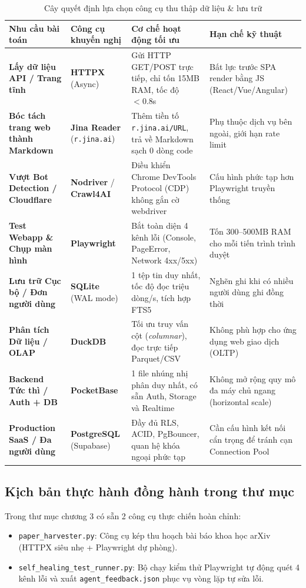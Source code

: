 \documentclass[a4paper,11pt]{article}
\begin{document}
\begin{table}[htbp]
\centering
\small
\caption{Cây quyết định lựa chọn công cụ thu thập dữ liệu \& lưu trữ}
\vspace{0.5em}
\begin{tabularx}{\textwidth}{L{2.8cm} L{3.5cm} L{4.5cm} Y}
\toprule
\textbf{Nhu cầu bài toán} & \textbf{Công cụ khuyến nghị} & \textbf{Cơ chế hoạt động tối ưu} & \textbf{Hạn chế kỹ thuật} \\
\midrule
\textbf{Lấy dữ liệu API / Trang tĩnh} & \textbf{HTTPX} (Async) & Gửi HTTP GET/POST trực tiếp, chỉ tốn 15MB RAM, tốc độ $< 0.8$s & Bất lực trước SPA render bằng JS (React/Vue/Angular) \\
\textbf{Bóc tách trang web thành Markdown} & \textbf{Jina Reader} (\texttt{r.jina.ai}) & Thêm tiền tố \texttt{r.jina.ai/URL}, trả về Markdown sạch 0 dòng code & Phụ thuộc dịch vụ bên ngoài, giới hạn rate limit \\
\textbf{Vượt Bot Detection / Cloudflare} & \textbf{Nodriver} / \textbf{Crawl4AI} & Điều khiển Chrome DevTools Protocol (CDP) không gắn cờ webdriver & Cấu hình phức tạp hơn Playwright truyền thống \\
\textbf{Test Webapp \& Chụp màn hình} & \textbf{Playwright} & Bắt toàn diện 4 kênh lỗi (Console, PageError, Network 4xx/5xx) & Tốn 300--500MB RAM cho mỗi tiến trình trình duyệt \\
\midrule
\textbf{Lưu trữ Cục bộ / Đơn người dùng} & \textbf{SQLite} (WAL mode) & 1 tệp tin duy nhất, tốc độ đọc triệu dòng/s, tích hợp FTS5 & Nghẽn ghi khi có nhiều người dùng ghi đồng thời \\
\textbf{Phân tích Dữ liệu / OLAP} & \textbf{DuckDB} & Tối ưu truy vấn cột (\textit{columnar}), đọc trực tiếp Parquet/CSV & Không phù hợp cho ứng dụng web giao dịch (OLTP) \\
\textbf{Backend Tức thì / Auth + DB} & \textbf{PocketBase} & 1 file nhúng nhị phân duy nhất, có sẵn Auth, Storage và Realtime & Không mở rộng quy mô đa máy chủ ngang (horizontal scale) \\
\textbf{Production SaaS / Đa người dùng} & \textbf{PostgreSQL} (Supabase) & Đầy đủ RLS, ACID, PgBouncer, quan hệ khóa ngoại phức tạp & Cần cấu hình kết nối cẩn trọng để tránh cạn Connection Pool \\
\bottomrule
\end{tabularx}
\end{table}

\subsection{Kịch bản thực hành đồng hành trong thư mục}
Trong thư mục chương 3 có sẵn 2 công cụ thực chiến hoàn chỉnh:
\begin{itemize}[leftmargin=1.5em]
    \item \texttt{paper\_harvester.py}: Công cụ kép thu hoạch bài báo khoa học arXiv (HTTPX siêu nhẹ + Playwright dự phòng).
    \item \texttt{self\_healing\_test\_runner.py}: Bộ chạy kiểm thử Playwright tự động quét 4 kênh lỗi và xuất \texttt{agent\_feedback.json} phục vụ vòng lặp tự sửa lỗi.
\end{itemize}
\end{document}
